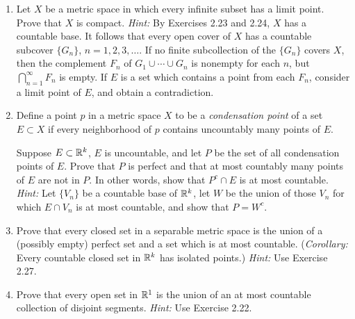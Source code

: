 \begin{enumerate}[label=\textbf{2.\arabic*.}, leftmargin=3.0em, itemsep=9pt,
                  topsep=8pt, labelsep=0.5em]
\item Let $X$ be a metric space in which every infinite subset has a limit
point. Prove that $X$ is compact. \emph{Hint:} By Exercises 2.23 and 2.24, $X$
has a countable base. It follows that every open cover of $X$ has a countable
subcover $\{G_n\}$, $n = 1,2,3,\dots$. If no finite subcollection of the
$\{G_n\}$ covers $X$, then the complement $F_n$ of $G_1 \cup \cdots \cup G_n$
is nonempty for each $n$, but $\bigcap_{n=1}^\infty F_n$ is empty. If $E$ is a
set which contains a point from each $F_n$, consider a limit point of $E$, and
obtain a contradiction.

\item Define a point $p$ in a metric space $X$ to be a \emph{condensation
point} of a set $E \subset X$ if every neighborhood of $p$ contains uncountably
many points of $E$.

Suppose $E \subset \mathbb{R}^k$, $E$ is uncountable, and let $P$ be the set of all
condensation points of $E$. Prove that $P$ is perfect and that at most
countably many points of $E$ are not in $P$. In other words, show that
$P^c \cap E$ is at most countable. \emph{Hint:} Let $\{V_n\}$ be a countable
base of $\mathbb{R}^k$, let $W$ be the union of those $V_n$ for which $E \cap V_n$ is
at most countable, and show that $P = W^c$.

\item Prove that every closed set in a separable metric space is the union of a
(possibly empty) perfect set and a set which is at most countable.
(\emph{Corollary:} Every countable closed set in $\mathbb{R}^k$ has isolated points.)
\emph{Hint:} Use Exercise 2.27.

\item Prove that every open set in $\mathbb{R}^1$ is the union of an at most countable
collection of disjoint segments. \emph{Hint:} Use Exercise 2.22.


\end{enumerate}
